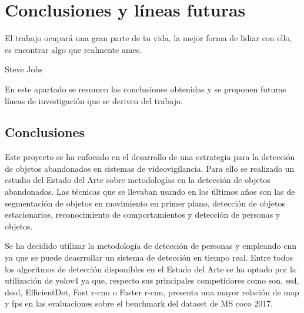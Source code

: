
\chapter{Conclusiones y líneas futuras}
\label{cha:concl-lineas-futuras}

\begin{FraseCelebre}
  \begin{Frase}
    El trabajo ocupará una gran parte de tu vida, la mejor forma de lidiar con ello, es encontrar algo que realmente ames.
  \end{Frase}
  \begin{Fuente}
    Steve Jobs
  \end{Fuente}
\end{FraseCelebre}

En este apartado se resumen las conclusiones obtenidas y se proponen futuras líneas de investigación
que se deriven del trabajo.

\section{Conclusiones}
\label{sec:conclusiones-finales}

Este proyecto se ha enfocado en el desarrollo de una estrategia para la detección de objetos abandonados en sistemas de videovigilancia. Para ello se realizado un estudio del Estado del Arte sobre metodologías en la detección de objetos abandonados. Las técnicas que se llevaban usando en los últimos años son las de segmentación de objetos en movimiento en primer plano, detección de objetos estacionarios, reconocimiento de comportamientos y detección de personas y objetos.

Se ha decidido utilizar la metodología de detección de personas y empleando \gls{cnn} ya que se puede deasrrollar un sistema de detección en tiempo real. Entre todos los algoritmos de detección disponibles en el Estado del Arte se ha optado por la utilización de \gls{yolo}v4 ya que, respecto sus principales competidores como son, \gls{ssd}, \gls{dssd}, EfficientDet, Fast \gls{r-cnn} o Faster \gls{r-cnn}, presenta una mayor relación de \gls{map} y \gls{fps} en las evaluaciones sobre el benchmark del dataset de MS \gls{coco} 2017.

